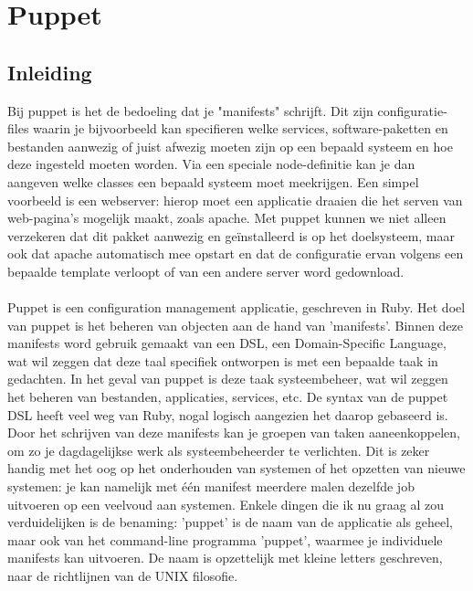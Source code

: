 \chapter{Puppet}

\section{Inleiding}
Bij puppet is het de bedoeling dat je "manifests" schrijft. Dit zijn configuratie-files waarin je bijvoorbeeld kan specifieren welke services, software-paketten en bestanden aanwezig of juist afwezig moeten zijn op een bepaald systeem en hoe deze ingesteld moeten worden. Via een speciale node-definitie kan je dan aangeven welke classes een bepaald systeem moet meekrijgen. Een simpel voorbeeld is een webserver: hierop moet een applicatie draaien die het serven van web-pagina's mogelijk maakt, zoals apache. Met puppet kunnen we niet alleen verzekeren dat dit pakket aanwezig en ge\"installeerd is op het doelsysteem, maar ook dat apache automatisch mee opstart en dat de configuratie ervan volgens een bepaalde template verloopt of van een andere server word gedownload.\\\\
%
Puppet is een configuration management applicatie, geschreven in Ruby. Het doel van puppet is het beheren van objecten aan de hand van 'manifests'. Binnen deze manifests word gebruik gemaakt van een DSL, een Domain-Specific Language, wat wil zeggen dat deze taal specifiek ontworpen is met een bepaalde taak in gedachten. In het geval van puppet is deze taak systeembeheer, wat wil zeggen het beheren van bestanden, applicaties, services, etc. De syntax van de puppet DSL heeft veel weg van Ruby, nogal logisch aangezien het daarop gebaseerd is. Door het schrijven van deze manifests kan je groepen van taken aaneenkoppelen, om zo je dagdagelijkse werk als systeembeheerder te verlichten. Dit is zeker handig met het oog op het onderhouden van systemen of het opzetten van nieuwe systemen: je kan namelijk met \'e\'en manifest meerdere malen dezelfde job uitvoeren op een veelvoud aan systemen. Enkele dingen die ik nu graag al zou verduidelijken is de benaming: 'puppet' is de naam van de applicatie als geheel, maar ook van het command-line programma 'puppet', waarmee je individuele manifests kan uitvoeren. De naam is opzettelijk met kleine letters geschreven, naar de richtlijnen van de UNIX filosofie.

